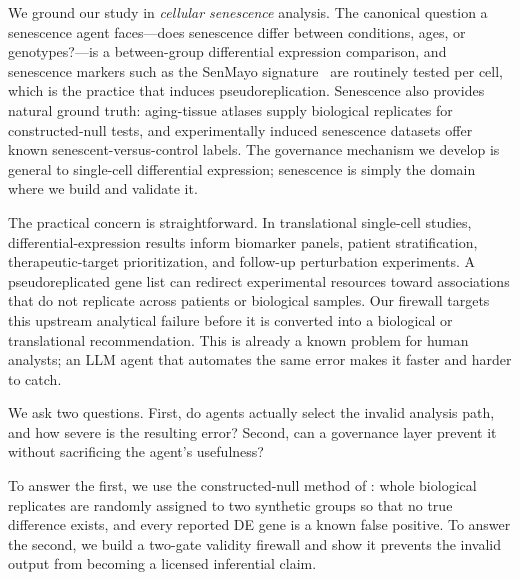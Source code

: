 \documentclass[pmlr,twocolumn,10pt]{jmlr}
\begin{document}
We ground our study in \textit{cellular senescence} analysis. The canonical
question a senescence agent faces---does senescence differ between conditions,
ages, or genotypes?---is a between-group differential expression comparison,
and senescence markers such as the SenMayo signature~\citep{saul2022} are
routinely tested per cell, which is the practice that induces pseudoreplication.
Senescence also provides natural ground truth: aging-tissue atlases supply
biological replicates for constructed-null tests, and experimentally induced
senescence datasets offer known senescent-versus-control labels. The governance
mechanism we develop is general to single-cell differential expression;
senescence is simply the domain where we build and validate it.

The practical concern is straightforward. In translational single-cell studies,
differential-expression results inform biomarker panels, patient
stratification, therapeutic-target prioritization, and follow-up perturbation
experiments. A pseudoreplicated gene list can redirect experimental resources
toward associations that do not replicate across patients or biological
samples. Our firewall targets this upstream analytical failure before it is
converted into a biological or translational recommendation. This is already a
known problem for human analysts; an LLM agent that automates the same error
makes it faster and harder to catch.

We ask two questions. First, do agents actually select the invalid analysis path,
and how severe is the resulting error? Second, can a governance layer prevent it
without sacrificing the agent's usefulness?

To answer the first, we use the constructed-null method of \citet{squair2021}:
whole biological replicates are randomly assigned to two synthetic groups so that
no true difference exists, and every reported DE gene is a known false positive.
To answer the second, we build a two-gate validity firewall and show it
prevents the invalid output from becoming a licensed inferential claim.
\end{document}
